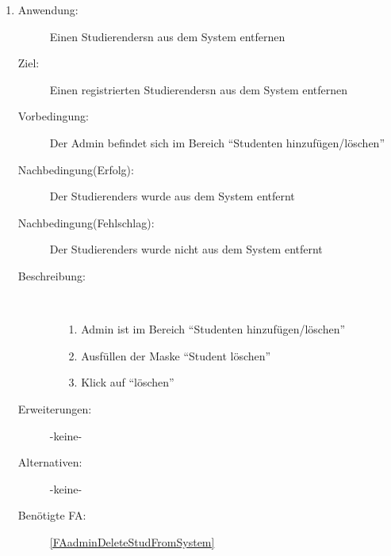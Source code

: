 \documentclass[parskip=full]{scrartcl}
\newcommand{\swtLabel}[1]{\textbf{/#1\arabic*0/}}
\begin{document}
\begin{enumerate} [label=\swtLabel{A}]
  \item \label{UCadminDeleteStudierender}
    \begin{description}
  	\item[Anwendung:] Einen \glspl{Studierender}n aus dem System entfernen
  	\item[Ziel:] Einen registrierten \glspl{Studierender}n aus dem System entfernen
  	\item[Vorbedingung:] Der \gls{Admin} befindet sich im Bereich
  	\enquote{Studenten hinzufügen/löschen}
  	\item[Nachbedingung(Erfolg):] Der \glspl{Studierender} wurde aus dem System entfernt
  	\item[Nachbedingung(Fehlschlag):] Der \glspl{Studierender} wurde nicht aus dem System
  	entfernt
  	\item[Beschreibung:]~
  	\begin{enumerate}
  	  \item[1.] \gls{Admin} ist im Bereich \enquote{Studenten
  	  hinzufügen/löschen}
      \item[2.] Ausfüllen der Maske \enquote{Student löschen}
      \item[3.] Klick auf \enquote{löschen}
  	\end{enumerate}
  	\item[Erweiterungen:] -keine-
  	\item[Alternativen:] -keine-
  	\item[Benötigte FA:] \ref{FAadminDeleteStudFromSystem}
  \end{description}
  

\end{enumerate}
\end{document}
